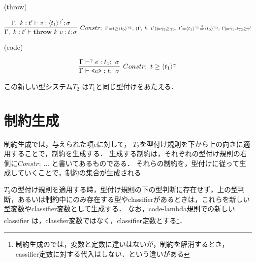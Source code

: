 (throw)

\[
  \infer[Constr;~ {\scriptstyle \Gamma \models \longer{t}{\codeT{t_0}{\gamma_2}},~ (\Gamma,~ k:~t') \models \gamma_2 \ord \gamma_0,~  t' = \contT{\codeT{t_1}{\gamma_1}}{\codeT{t_0}{\gamma_0}}{\sigma},~ \Gamma \models \gamma_1 \uni \gamma_2 \ord \gamma'}]
  {\Gamma,~ k:t'
    \vdash \throw{k}{v} : t ; \sigma}
  {\Gamma,~ k:t'
    \vdash v : \codeT{t_1}{\gamma'} ; \sigma
  }
\]

(code)

\[
  \infer[Constr;~\longer{t}{\codeT{t_1}{\gamma}}]
  {\Gamma \vdash \code{e} : t;~\sigma}
  {\Gamma \vdash^\gamma e : t_1;~\sigma}
\]


この新しい型システム$T_2$ は$T_1$と同じ型付けをあたえる．

\section{制約生成}

制約生成では，与えられた項$e$に対して，
$T_2$を型付け規則を下から上の向きに適用することで，制約を生成する．
生成する制約は，それぞれの型付け規則の右側に$Constr;~ ...$ と書いてあるものである．
それらの制約を，型付けに従って生成していくことで，制約の集合が生成される

$T_2$の型付け規則を適用する時，型付け規則の下の型判断に存在せず，上の型判断，あるいは制約中にのみ存在する型やclassifierがあるときは，これらを新しい型変数やclassifier変数として生成する．
なお，code-lambda規則での新しいclassifier は，classfier変数ではなく，classifier定数とする\footnote{制約生成のでは，変数と定数に違いはないが，制約を解消するとき，cassifier定数に対する代入はしない．という違いがある}．

